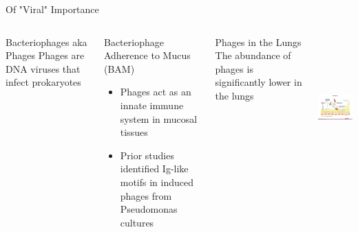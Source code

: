 \documentclass[11pt]{beamer}
\begin{document}
	
	\begin{frame}{Of "Viral" Importance}
	\begin{columns}
	
	\begin{block}{Bacteriophages aka Phages}
	Phages are DNA viruses that infect prokaryotes
	\end{block}
	
	\begin{block}{Bacteriophage Adherence to Mucus (BAM)}
	\begin{itemize}
	\item \alert{Phages act as an innate immune system in mucosal tissues}
	\item Prior studies identified Ig-like motifs in induced phages from Pseudomonas cultures
	\end{itemize}
	\end{block}
	
	\begin{block}{Phages in the Lungs}
	The abundance of phages is significantly lower in the lungs
	\end{block}
	
	\includegraphics[height=5.5cm, width=5cm]{barr.png}
	\end{columns}

	
	
	
	\end{frame}
	
\end{document}
